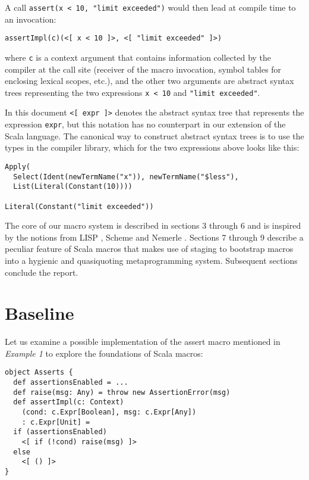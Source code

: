 \documentclass{llncs}
\begin{document}
A call \lstinline$assert(x < 10, "limit exceeded")$ would then lead at compile time to an invocation:

\begin{lstlisting}
assertImpl(c)(<[ x < 10 ]>, <[ "limit exceeded" ]>)
\end{lstlisting}

where \lstinline$c$ is a context argument that contains information collected by the compiler at the call site (receiver of the macro invocation, symbol tables for enclosing lexical scopes, etc.), and the other two arguments are abstract syntax trees representing the two expressions \lstinline$x < 10$ and \lstinline$"limit exceeded"$.

In this document \lstinline$<[ expr ]>$ denotes the abstract syntax tree that represents the expression \lstinline$expr$, but this notation has no counterpart in our extension of the Scala language. The canonical way to construct abstract syntax trees is to use the types in the compiler library, which for the two expressions above looks like this:

\begin{lstlisting}
Apply(
  Select(Ident(newTermName("x")), newTermName("$less"),
  List(Literal(Constant(10))))

Literal(Constant("limit exceeded"))
\end{lstlisting}

The core of our macro system is described in sections 3 through 6 and is inspired by the notions from LISP \cite{steele90}, Scheme \cite{scheme10} and Nemerle \cite{skalski05}. Sections 7 through 9 describe a peculiar feature of Scala macros that makes use of staging to bootstrap macros into a hygienic and quasiquoting metaprogramming system. Subsequent sections conclude the report.

\section{Baseline}

\noindent
Let us examine a possible implementation of the assert macro mentioned in \emph{Example 1} to explore the foundations of Scala macros:
\noindent

\begin{lstlisting}
object Asserts {
  def assertionsEnabled = ...
  def raise(msg: Any) = throw new AssertionError(msg)
  def assertImpl(c: Context)
    (cond: c.Expr[Boolean], msg: c.Expr[Any])
    : c.Expr[Unit] =
  if (assertionsEnabled)
    <[ if (!cond) raise(msg) ]>
  else
    <[ () ]>
}
\end{lstlisting}
\end{document}
